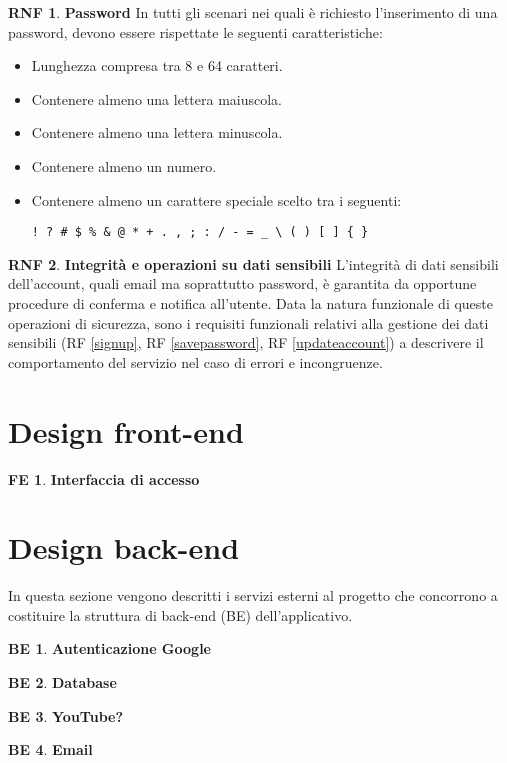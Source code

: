 \documentclass[11pt, a4paper]{article}
\theoremstyle{definition}
\newtheorem{nonfuncreq}{RNF} %
\newtheorem{backend}{BE}
\newtheorem{frontend}{FE}
\begin{document}
\begin{nonfuncreq}
\label{legalpassword}
\textbf{Password }
In tutti gli scenari nei quali è richiesto l'inserimento di una password,
devono essere rispettate le seguenti caratteristiche:
\begin{itemize}
    \item Lunghezza compresa tra 8 e 64 caratteri.
    \item Contenere almeno una lettera maiuscola.
    \item Contenere almeno una lettera minuscola.
    \item Contenere almeno un numero.
    \item Contenere almeno un carattere speciale scelto tra i
    seguenti:
    \begin{center}
        \verb|! ? # $ % & @ * + . , ; : / - = _ \ ( ) [ ] { }|
    \end{center}
\end{itemize}
\end{nonfuncreq}

\begin{nonfuncreq}
\textbf{Integrità e operazioni su dati sensibili }
L'integrità di dati sensibili dell'account, quali email ma soprattutto password,
è garantita da opportune procedure di conferma e notifica all'utente.
Data la natura funzionale di queste operazioni di sicurezza, sono i requisiti
funzionali relativi alla gestione dei dati sensibili
(RF \ref{signup}, RF \ref{savepassword}, RF \ref{updateaccount})
a descrivere il comportamento del servizio nel caso di errori e incongruenze.
\end{nonfuncreq}


\newpage


\section{Design front-end}
\begin{frontend}
\textbf{Interfaccia di accesso }
\end{frontend}


\section{Design back-end}
In questa sezione vengono descritti i servizi esterni al progetto che
concorrono a costituire la struttura di back-end (BE) dell'applicativo.

\begin{backend}
\textbf{Autenticazione Google }
\end{backend}

\begin{backend}
\textbf{Database }
\end{backend}

\begin{backend}
\textbf{YouTube? }
\end{backend}

\begin{backend}
\textbf{Email }
\end{backend}
\end{document}
